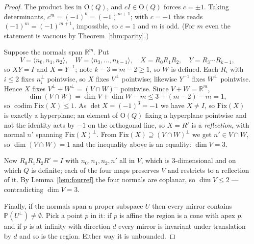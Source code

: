 \documentclass[11pt,a4paper]{article}
\theoremstyle{plain}
\theoremstyle{definition}
\theoremstyle{remark}
\begin{document}
\begin{proof}
The product lies in $\mathrm{O}(Q)$, and $cI\in\mathrm{O}(Q)$ forces $c=\pm1$.
Taking determinants, $c^m=(-1)^k=(-1)^{m+1}$; with $c=-1$ this reads
$(-1)^m=(-1)^{m+1}$, impossible, so $c=1$ and $m$ is odd. (For $m$ even the
statement is vacuous by Theorem~\ref{thm:parity}.)

Suppose the normals span $\mathbb{R}^m$. Put
\[
  V=\langle n_0,n_1,n_2\rangle,\quad W=\langle n_3,\dots,n_{k-1}\rangle,\quad
  X=R_0R_1R_2,\quad Y=R_3\cdots R_{k-1},
\]
so $XY=I$ and $X=Y^{-1}$; note $k-3=m-2\ge1$, so $W$ is defined. Each $R_i$ with
$i\le2$ fixes $n_i^\perp$ pointwise, so $X$ fixes $V^\perp$ pointwise; likewise
$Y^{-1}$ fixes $W^\perp$ pointwise. Hence $X$ fixes
$V^\perp+W^\perp=(V\cap W)^\perp$ pointwise. Since $V+W=\mathbb{R}^m$,
\[
  \dim(V\cap W)=\dim V+\dim W-m\le 3+(m-2)-m=1 ,
\]
so $\operatorname{codim}\mathrm{Fix}(X)\le1$. As $\det X=(-1)^3=-1$ we have
$X\neq I$, so $\mathrm{Fix}(X)$ is exactly a hyperplane; an element of
$\mathrm{O}(Q)$ fixing a hyperplane pointwise and not the identity acts by $-1$ on
the orthogonal line, so $X=R'$ is a \emph{reflection}, with normal $n'$ spanning
$\mathrm{Fix}(X)^\perp$. From $\mathrm{Fix}(X)\supseteq(V\cap W)^\perp$ we get
$n'\in V\cap W$, so $\dim(V\cap W)=1$ and the inequality above is an equality:
$\dim V=3$.

Now $R_0R_1R_2R'=I$ with $n_0,n_1,n_2,n'$ all in $V$, which is $3$-dimensional and
 on which $Q$ is definite; each of the four maps preserves $V$ and restricts to a
 reflection of it. By Lemma~\ref{lem:fourref} the four normals are coplanar, so
$\dim V\le2$ --- contradicting $\dim V=3$.

Finally, if the normals span a proper subspace $U$ then every mirror contains
$\mathbb{P}(U^\perp)\neq\emptyset$. Pick a point $p$ in it: if $p$ is affine the
region is a cone with apex $p$, and if $p$ is at infinity with direction $d$ every
mirror is invariant under translation by $d$ and so is the region. Either way it is
unbounded.
\end{proof}
\end{document}
